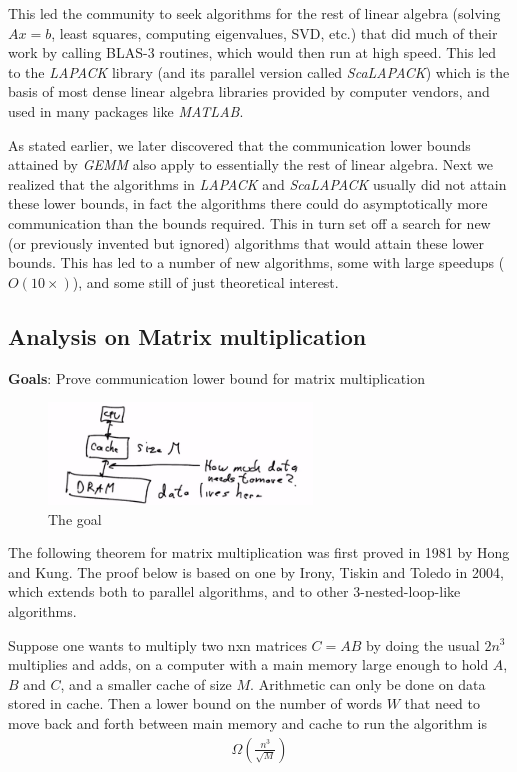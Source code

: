 \documentclass[11pt]{article}
\numberwithin{equation}{section}
\begin{document}
This led the community to seek algorithms for the rest of linear algebra (solving $Ax=b$, least squares, computing eigenvalues, SVD, etc.)
that did much of their work by calling BLAS-3 routines, which would then run at high speed. This led to the \textit{LAPACK} library 
(and its parallel version called \textit{ScaLAPACK}) which is the basis of most dense linear algebra libraries provided by computer vendors, 
and used in many packages like \textit{MATLAB}.

As stated earlier, we later discovered that the communication lower bounds attained by \textit{GEMM} also apply to essentially the rest of linear algebra. 
Next we realized that the algorithms in \textit{LAPACK} and \textit{ScaLAPACK} usually did not attain these lower bounds, 
in fact the algorithms there could do asymptotically more communication than the bounds required. This in turn set off a search for new 
(or previously invented but ignored) algorithms that would attain these lower bounds. This has led to a number of new algorithms, some with large speedups ($O(10\times)$),
and some still of just theoretical interest.

\subsection{Analysis on Matrix multiplication}
\textbf{Goals}: Prove communication lower bound for matrix multiplication

\begin{figure}[h]
    \centering
    \includegraphics[width = 7cm]{images/lec4-4.png}
    \caption{The goal}
\end{figure}

The following theorem for matrix multiplication was first proved in 1981 by Hong and Kung. The proof below is based on one by Irony, Tiskin and Toledo in 2004, 
which extends both to parallel algorithms, and to other 3-nested-loop-like algorithms.

\begin{theorem}
    Suppose one wants to multiply two nxn matrices $C = AB$ by doing the usual $2n^3$ multiplies and adds, 
    on a computer with a main memory large enough to hold $A$, $B$ and $C$, and a smaller cache of size $M$. Arithmetic can only be done on data stored in cache. 
    Then a lower bound on the number of words $W$ that need to move back and forth between main memory and cache to run the algorithm is \begin{align*}
        \Omega(\frac{n^3}{\sqrt{M}})
    \end{align*}
\end{theorem}
\end{document}
